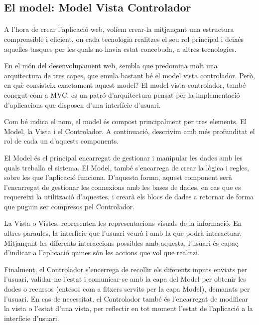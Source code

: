 \subsection{El model: Model Vista Controlador}

    \paragraph{}
    A l'hora de crear l’aplicació web, volíem crear-la mitjançant una estructura comprensible i eficient, on cada tecnologia realitzes el seu rol principal i deixés aquelles tasques per les quals no havia estat concebuda, a altres tecnologies.

    En el món del desenvolupament web, sembla que predomina molt una arquitectura de tres capes, que emula bastant bé el model vista controlador. Però, en què consisteix exactament aquest model? El model vista controlador, també conegut com a MVC, és un patró d'arquitectura pensat per la implementació d'aplicacions que disposen d’una interfície d'usuari.

    Com bé indica el nom, el model és compost principalment per tres elements. El Model, la Vista i el Controlador. A continuació, descrivim amb més profunditat el rol de cada un d’aquests components.

    El Model és el principal encarregat de gestionar i manipular les dades amb les quals treballa el sistema. El Model, també s’encarrega de crear la lògica i regles, sobre les que l'aplicació funciona. D’aquesta forma, aquest component serà l’encarregat de gestionar les connexions amb les bases de dades, en cas que es requereixi la utilització d’aquestes, i crearà els blocs de dades a retornar de forma que puguin ser compresos pel Controlador.

    La Vista o Vistes, representen les representacions visuals de la informació. En altres paraules, la interfície que l’usuari veurà i amb la que podrà interactuar. Mitjançant les diferents interaccions possibles amb aquesta, l'usuari és capaç d’indicar a l’aplicació quines són les accions que vol que realitzi.

    Finalment, el Controlador s'encerrega de recollir els diferents inputs enviats per l'usuari, validar-ne l'estat i comunicar-se amb la capa del Model per obtenir les dades o recursos (entesos com a fitxers servits per la capa Model), demanats per l’usuari. En cas de necessitat, el Controlador també és l’encarregat de modificar la vista o l’estat d’una vista, per reflectir en tot moment l’estat de l’aplicació a la interfície d’usuari.

